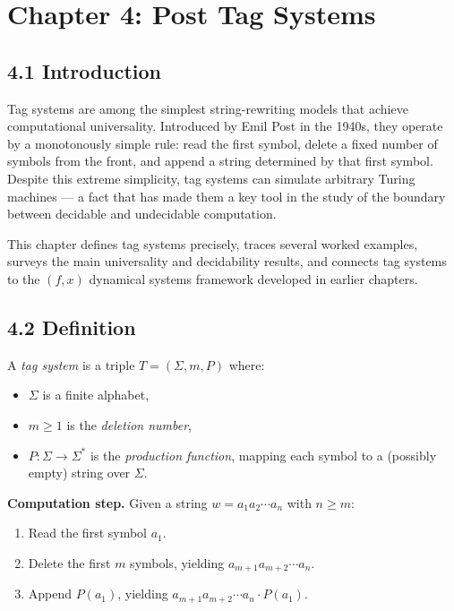\chapter{Chapter 4: Post Tag Systems}

\section{4.1 Introduction}

Tag systems are among the simplest string-rewriting models that achieve computational universality. Introduced by Emil Post in the 1940s, they operate by a monotonously simple rule: read the first symbol, delete a fixed number of symbols from the front, and append a string determined by that first symbol. Despite this extreme simplicity, tag systems can simulate arbitrary Turing machines --- a fact that has made them a key tool in the study of the boundary between decidable and undecidable computation.

This chapter defines tag systems precisely, traces several worked examples, surveys the main universality and decidability results, and connects tag systems to the $(f, x)$ dynamical systems framework developed in earlier chapters.

\section{4.2 Definition}

\begin{definition}
A \textit{tag system} is a triple $T = (\Sigma, m, P)$ where:
\end{definition}

\begin{itemize}
  \item $\Sigma$ is a finite alphabet,
  \item $m \geq 1$ is the \textit{deletion number},
  \item $P: \Sigma \to \Sigma^*$ is the \textit{production function}, mapping each symbol to a (possibly empty) string over $\Sigma$.
\end{itemize}

\textbf{Computation step.} Given a string $w = a_1 a_2 \cdots a_n$ with $n \geq m$:

\begin{enumerate}
  \item Read the first symbol $a_1$.
  \item Delete the first $m$ symbols, yielding $a_{m+1} a_{m+2} \cdots a_n$.
  \item Append $P(a_1)$, yielding $a_{m+1} a_{m+2} \cdots a_n \cdot P(a_1)$.
\end{enumerate}

